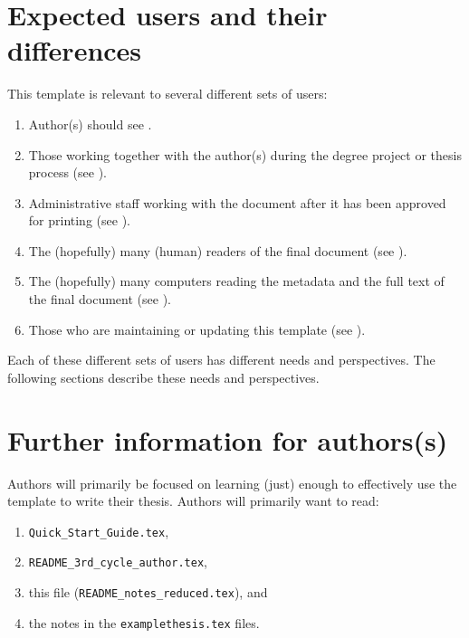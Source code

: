 \documentclass[12pt, twoside]{article}
\newcommand{\fname}[1]{\texttt{#1}}
\begin{document}
\section{Expected users and their differences}
\label{sec:expectedUsers}
This template is relevant to several different sets of users:
\begin{enumerate}[leftmargin=*,label=\textbf{Users \arabic*}, ref={Users \arabic*}]
    \item \label{users:authors} Author(s) should see .
    
    \item \label{users:others} Those working together with the author(s) during the degree project or thesis process (see ).
    
    \item \label{users:admins} Administrative staff working with the document after it has been approved for printing (see ).
    
    \item \label{users:readers} The (hopefully) many (human) readers of the final document (see ).
    
    \item \label{users:searchEngines} The (hopefully) many computers reading the metadata and the full text of the final document (see ).
    
    \item \label{users:maintainer} Those who are maintaining or updating this template (see ).
\end{enumerate}

Each of these different sets of users has different needs and perspectives. The following sections describe these needs and perspectives.

\section{Further information for authors(s)}
\label{sec:furtherInfoForAuthors}

Authors will primarily be focused on learning (just) enough to effectively use the template to write their thesis. Authors will primarily want to read:
\begin{enumerate}
    \item \fname{Quick\_Start\_Guide.tex}, 
    \item \fname{README\_3rd\_cycle\_author.tex},
    \item this file (\ie \fname{README\_notes\_reduced.tex}), and
    \item the notes in the \fname{examplethesis.tex} files.
\end{enumerate}
\end{document}
